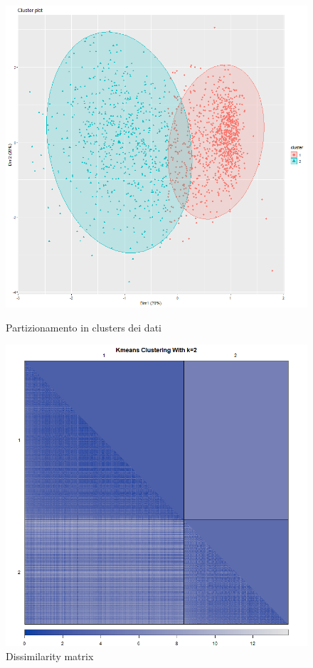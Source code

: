 \documentclass[letterpaper,11pt]{article}
\begin{document}
\begin{figure}[!htb]
   \begin{minipage}{0.48\textwidth}
     \centering
         \includegraphics[width=1\textwidth]{Img/K-MEANS/KMEANS005.png}
    \caption{Partizionamento in clusters dei dati}
    \label{fig:clusters}
   \end{minipage}\hfill
   \begin{minipage}{0.48\textwidth}
     \centering
     \includegraphics[width=1\linewidth]{Img/K-MEANS/KMEANS006.png}
     \caption{Dissimilarity matrix}\label{fig:dissimilaritymatrix}
   \end{minipage}
\end{figure}
\end{document}
